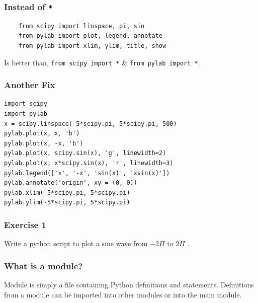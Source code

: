 \documentclass[presentation]{beamer}
\begin{document}
\begin{frame}[fragile]
\frametitle{Instead of \texttt{*}}
\label{sec-8}

\begin{verbatim}
    from scipy import linspace, pi, sin
    from pylab import plot, legend, annotate
    from pylab import xlim, ylim, title, show
\end{verbatim}

  Is better than, \texttt{from scipy import *} \& \texttt{from pylab import *}.
\end{frame}
\begin{frame}[fragile]
\frametitle{Another Fix}
\label{sec-9}

\begin{verbatim}
import scipy
import pylab
x = scipy.linspace(-5*scipy.pi, 5*scipy.pi, 500)
pylab.plot(x, x, 'b')
pylab.plot(x, -x, 'b')
pylab.plot(x, scipy.sin(x), 'g', linewidth=2)
pylab.plot(x, x*scipy.sin(x), 'r', linewidth=3)
pylab.legend(['x', '-x', 'sin(x)', 'xsin(x)'])
pylab.annotate('origin', xy = (0, 0))
pylab.xlim(-5*scipy.pi, 5*scipy.pi)
pylab.ylim(-5*scipy.pi, 5*scipy.pi)
\end{verbatim}
\end{frame}
\begin{frame}
\frametitle{Exercise 1}
\label{sec-10}

  Write a python script to plot a sine wave from 
    $-2\Pi$
  to 
    $2\Pi$
  .
\end{frame}
\begin{frame}
\frametitle{What is a module?}
\label{sec-11}

  Module is simply a file containing Python definitions and
  statements. Definitions from a module can be imported into other
  modules or into the main module.
\end{frame}
\end{document}
